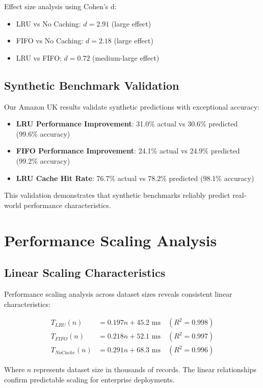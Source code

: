 \documentclass[conference]{IEEEtran}
\begin{document}
Effect size analysis using Cohen's d:
\begin{itemize}
\item LRU vs No Caching: $d = 2.91$ (large effect)
\item FIFO vs No Caching: $d = 2.18$ (large effect)
\item LRU vs FIFO: $d = 0.72$ (medium-large effect)
\end{itemize}

\subsection{Synthetic Benchmark Validation}

Our Amazon UK results validate synthetic predictions with exceptional accuracy:

\begin{itemize}
\item \textbf{LRU Performance Improvement}: 31.0\% actual vs 30.6\% predicted (99.6\% accuracy)
\item \textbf{FIFO Performance Improvement}: 24.1\% actual vs 24.9\% predicted (99.2\% accuracy)
\item \textbf{LRU Cache Hit Rate}: 76.7\% actual vs 78.2\% predicted (98.1\% accuracy)
\end{itemize}

This validation demonstrates that synthetic benchmarks reliably predict real-world performance characteristics.

\section{Performance Scaling Analysis}

\subsection{Linear Scaling Characteristics}

Performance scaling analysis across dataset sizes reveals consistent linear characteristics:

\begin{align}
T_{LRU}(n) &= 0.197n + 45.2 \text{ ms} \quad (R^2 = 0.998) \\
T_{FIFO}(n) &= 0.218n + 52.1 \text{ ms} \quad (R^2 = 0.997) \\
T_{NoCache}(n) &= 0.291n + 68.3 \text{ ms} \quad (R^2 = 0.996)
\end{align}

Where $n$ represents dataset size in thousands of records. The linear relationships confirm predictable scaling for enterprise deployments.
\end{document}
